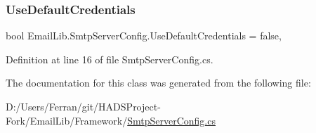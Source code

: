 \subsubsection{\texorpdfstring{UseDefaultCredentials}{UseDefaultCredentials}}
{\footnotesize\ttfamily bool Email\+Lib.\+Smtp\+Server\+Config.\+Use\+Default\+Credentials = false\hspace{0.3cm}{\ttfamily [get]}, {\ttfamily [set]}}



Definition at line 16 of file Smtp\+Server\+Config.\+cs.



The documentation for this class was generated from the following file\+:\begin{DoxyCompactItemize}
\item 
D\+:/\+Users/\+Ferran/git/\+H\+A\+D\+S\+Project-\/\+Fork/\+Email\+Lib/\+Framework/\mbox{\hyperlink{SmtpServerConfig_8cs}{Smtp\+Server\+Config.\+cs}}\end{DoxyCompactItemize}
